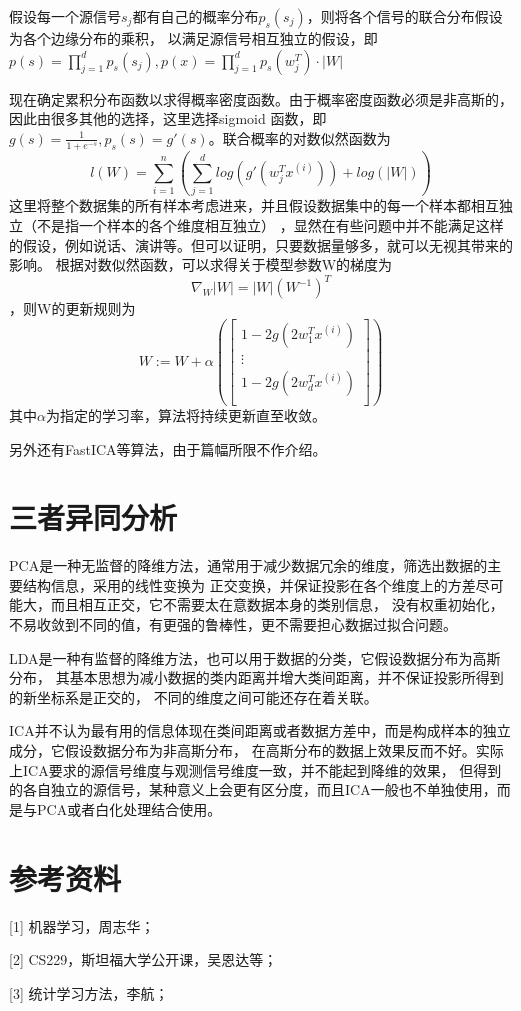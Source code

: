 \documentclass{article}
\begin{document}
假设每一个源信号$s_j$都有自己的概率分布$p_s(s_j)$，则将各个信号的联合分布假设为各个边缘分布的乘积，
以满足源信号相互独立的假设，即$p(s) = {\prod}_{j=1}^d p_s(s_j), p(x) = {\prod}_{j=1}^d p_s(w_j^T) \cdot |W|$

现在确定累积分布函数以求得概率密度函数。由于概率密度函数必须是非高斯的，因此由很多其他的选择，这里选择sigmoid
函数，即$g(s) = \frac{1}{1+e^{-s}}, p_s(s) = g'(s)$。联合概率的对数似然函数为
$$ l(W) = {\sum}_{i=1}^n({\sum}_{j=1}^d log(g'(w_j^Tx^{(i)})) + log(|W|)) $$
这里将整个数据集的所有样本考虑进来，并且假设数据集中的每一个样本都相互独立（不是指一个样本的各个维度相互独立）
，显然在有些问题中并不能满足这样的假设，例如说话、演讲等。但可以证明，只要数据量够多，就可以无视其带来的影响。
根据对数似然函数，可以求得关于模型参数W的梯度为
$$ {\nabla}_W |W| = |W| (W^{-1})^T $$，则W的更新规则为
$$ W:=W+{\alpha}(\begin{bmatrix}
    1-2g(2w_1^Tx^{(i)}) \\
    \vdots \\
    1-2g(2w_d^Tx^{(i)}) \\
\end{bmatrix}) $$
其中$\alpha$为指定的学习率，算法将持续更新直至收敛。

另外还有FastICA等算法，由于篇幅所限不作介绍。


\section{三者异同分析}

PCA是一种无监督的降维方法，通常用于减少数据冗余的维度，筛选出数据的主要结构信息，采用的线性变换为
正交变换，并保证投影在各个维度上的方差尽可能大，而且相互正交，它不需要太在意数据本身的类别信息，
没有权重初始化，不易收敛到不同的值，有更强的鲁棒性，更不需要担心数据过拟合问题。

LDA是一种有监督的降维方法，也可以用于数据的分类，它假设数据分布为高斯分布，
其基本思想为减小数据的类内距离并增大类间距离，并不保证投影所得到的新坐标系是正交的，
不同的维度之间可能还存在着关联。

ICA并不认为最有用的信息体现在类间距离或者数据方差中，而是构成样本的独立成分，它假设数据分布为非高斯分布，
在高斯分布的数据上效果反而不好。实际上ICA要求的源信号维度与观测信号维度一致，并不能起到降维的效果，
但得到的各自独立的源信号，某种意义上会更有区分度，而且ICA一般也不单独使用，而是与PCA或者白化处理结合使用。

\section{参考资料}

[1] 机器学习，周志华；

[2] CS229，斯坦福大学公开课，吴恩达等；

[3] 统计学习方法，李航；
\end{document}
